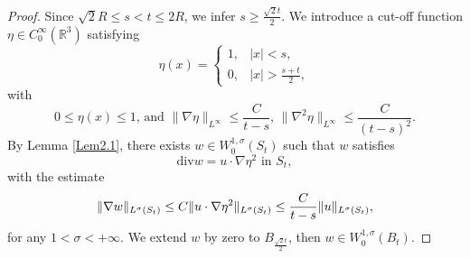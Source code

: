 \documentclass[11pt,reqno]{amsart}
\numberwithin{Thm}{section}
\begin{document}
\begin{proof}
Since $\sqrt{2}R\leq s<t\leq 2R$, we infer $s\geq\frac{\sqrt{2}t}{2}$. We introduce a cut-off function $\eta \in C_0^{\infty}\left(\mathbb{R}^{3}\right)$ satisfying
\begin{equation*}
\eta(x)= \begin{cases}1, & |x| <s, \\ 0, & |x| >\frac{s+t}{2},\end{cases}
\end{equation*}
with
$$\text{$0\leq\eta (x)\leq 1$, and $\|\nabla \eta\|_{L^{\infty}} \leq \frac{C}{t-s}$, $\|\nabla^2\eta\|_{L^{\infty}} \leq \frac{C}{(t-s)^2}$.}$$
By Lemma \ref{Lem2.1}, there exists $w\in W_{0}^{1,\sigma}(S_t)$ such that $w$ satisfies
$$
\mathrm{div }w=u\cdot\nabla\eta^{2} \text{ in }S_t,
$$
with the estimate
\begin{equation}\label{ine3.3}
\aligned
\|\nabla w\|_{L^\sigma\left(S_t\right)}\leq C\|u\cdot\nabla\eta^2\|_{L^\sigma\left(S_t\right)}\leq\frac{C}{t-s}\|u\|_{L^\sigma(S_t)},
\endaligned
\end{equation}
for any $1<\sigma<+\infty$. We extend $w$ by zero to $B_\frac{\sqrt{2}t}{2}$, then $w\in W_{0}^{1,\sigma}(B_t).$


\end{proof}
\end{document}
